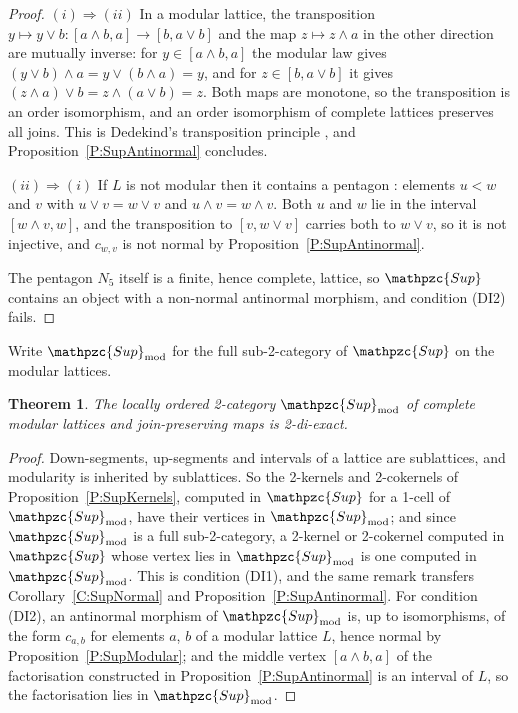 \documentclass[reqno,a4paper]{amsart}
\numberwithin{equation}{section}
\theoremstyle{plain}
\newtheorem{theorem}[subsection]{Theorem}
\theoremstyle{definition}
\def\nameit#1{\textrm{#1}~}
\def\prox{\nameit{Proposition}}
\def\corx{\nameit{Corollary}}
\newcommand{\catfont}[1]{\ensuremath{\mathpzc{#1}}\xspace}
\newcommand{\Sup}{\catfont{Sup}}
\newcommand{\Supmod}{\ensuremath{\mathpzc{Sup}_{\mathrm{mod}}}}
\renewcommand{\1}{\onecat{1}}
\begin{document}
\begin{proof}
	\((i)\Rightarrow(ii)\) In a modular lattice, the transposition \(y\mapsto y\vee b\colon[a\wedge b,a]\to[b,a\vee b]\) and the map \(z\mapsto z\wedge a\) in the other direction are mutually inverse: for \(y\in[a\wedge b,a]\) the modular law gives \((y\vee b)\wedge a=y\vee(b\wedge a)=y\), and for \(z\in[b,a\vee b]\) it gives \((z\wedge a)\vee b=z\wedge(a\vee b)=z\). Both maps are monotone, so the transposition is an order isomorphism, and an order isomorphism of complete lattices preserves all joins. This is Dedekind's transposition principle \cite[Chapter~I, Theorem~13]{Birkhoff}, and \prox\ref{P:SupAntinormal} concludes.

	\((ii)\Rightarrow(i)\) If \(L\) is not modular then it contains a pentagon \cite[Chapter~I, Theorem~12]{Birkhoff}: elements \(u<w\) and \(v\) with \(u\vee v=w\vee v\) and \(u\wedge v=w\wedge v\). Both \(u\) and \(w\) lie in the interval \([w\wedge v,w]\), and the transposition to \([v,w\vee v]\) carries both to \(w\vee v\), so it is not injective, and \(c_{w,v}\) is not normal by \prox\ref{P:SupAntinormal}.

	The pentagon \(N_{5}\) itself is a finite, hence complete, lattice, so \(\Sup\) contains an object with a non-normal antinormal morphism, and condition \textup{(DI2)} fails.
\end{proof}

Write \(\Supmod\) for the full sub-2-category of \(\Sup\) on the modular lattices.

\begin{theorem}\label{T:LatticeModel}
	The locally ordered 2-category \(\Supmod\) of complete modular lattices and join-preserving maps is 2-di-exact.
\end{theorem}

\begin{proof}
	Down-segments, up-segments and intervals of a lattice are sublattices, and modularity is inherited by sublattices. So the 2-kernels and 2-cokernels of \prox\ref{P:SupKernels}, computed in \(\Sup\) for a 1-cell of \(\Supmod\), have their vertices in \(\Supmod\); and since \(\Supmod\) is a full sub-2-category, a 2-kernel or 2-cokernel computed in \(\Sup\) whose vertex lies in \(\Supmod\) is one computed in \(\Supmod\). This is condition \textup{(DI1)}, and the same remark transfers \corx\ref{C:SupNormal} and \prox\ref{P:SupAntinormal}. For condition \textup{(DI2)}, an antinormal morphism of \(\Supmod\) is, up to isomorphisms, of the form \(c_{a,b}\) for elements \(a\), \(b\) of a modular lattice \(L\), hence normal by \prox\ref{P:SupModular}; and the middle vertex \([a\wedge b,a]\) of the factorisation constructed in \prox\ref{P:SupAntinormal} is an interval of \(L\), so the factorisation lies in \(\Supmod\).
\end{proof}
\end{document}

